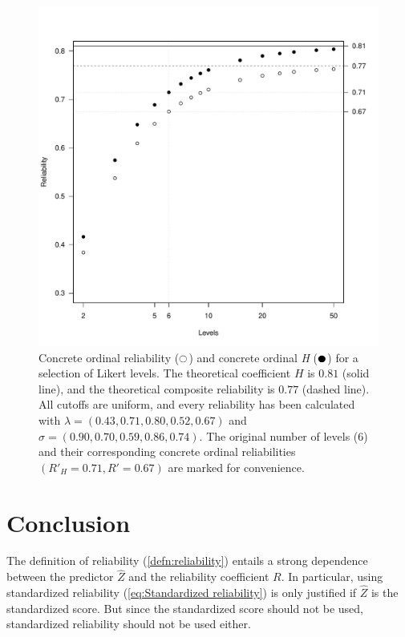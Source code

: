 \documentclass[twoside]{article}
\begin{document}
\begin{figure}
\noindent \begin{centering}
\includegraphics[scale=0.5]{chunks/ordinals}
\par\end{centering}
\caption{\label{fig:Ordinal reliability}Concrete ordinal reliability ($\fullmoon$)
and concrete ordinal \textit{H} ($\newmoon$) for a selection of Likert levels. The
theoretical coefficient $H$ is $0.81$ (solid line), and the theoretical
composite reliability is $0.77$ (dashed line). All cutoffs are uniform,
and every reliability has been calculated with $\lambda=(0.43,0.71,0.80,0.52,0.67)$
and $\sigma=(0.90,0.70,0.59,0.86,0.74)$. The original number of levels
($6$) and their corresponding concrete ordinal reliabilities $( R'_{H}=0.71, R'=0.67)$
are marked for convenience.}
\end{figure}

\section{Conclusion}
The definition of reliability (\cref{defn:reliability}) entails a strong dependence between the predictor $\hat{Z}$ and the reliability coefficient $ R$. In particular, using standardized reliability (\cref{eq:Standardized reliability}) is only justified if $\hat{Z}$ is the standardized score. But since the standardized score should not be used, standardized reliability should not be used either.
\end{document}
